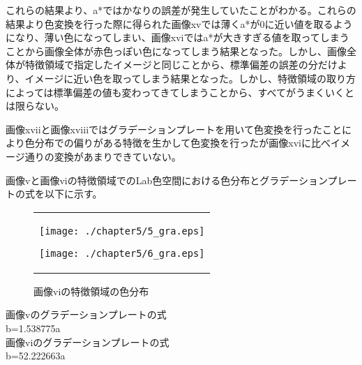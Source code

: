 \newpage
これらの結果より、a*ではかなりの誤差が発生していたことがわかる。これらの結果より色変換を行った際に得られた画像xvでは薄くa*が0に近い値を取るようになり、薄い色になってしまい、画像xviではa*が大きすぎる値を取ってしまうことから画像全体が赤色っぽい色になってしまう結果となった。しかし、画像全体が特徴領域で指定したイメージと同じことから、標準偏差の誤差の分だけより、イメージに近い色を取ってしまう結果となった。しかし、特徴領域の取り方によっては標準偏差の値も変わってきてしまうことから、すべてがうまくいくとは限らない。\par


画像xviiと画像xviiiではグラデーションプレートを用いて色変換を行ったことにより色分布での偏りがある特徴を生かして色変換を行ったが画像xviに比べイメージ通りの変換があまりできていない。\par

画像vと画像viの特徴領域でのLab色空間における色分布とグラデーションプレートの式を以下に示す。
\begin{figure}[htbp]
  \begin{center}
    \begin{tabular}{c}

      \begin{minipage}{0.45\hsize}
        \begin{center}
          \texttt{[image: ./chapter5/5\_gra.eps]}
          \caption{画像vの特徴領域の色分布}
          \label{fig:seininhsv}
        \end{center}
      \end{minipage}

      \begin{minipage}{0.45\hsize}
        \begin{center}
          \texttt{[image: ./chapter5/6\_gra.eps]}
          \caption{画像viの特徴領域の色分布}
          \label{fig:kinninhsv}
        \end{center}
      \end{minipage}


    \end{tabular}
  \end{center}
\end{figure}

\begin{screen}
画像vのグラデーションプレートの式\\
b=1.538775a\\
画像viのグラデーションプレートの式\\
b=52.222663a
  \end{screen}


